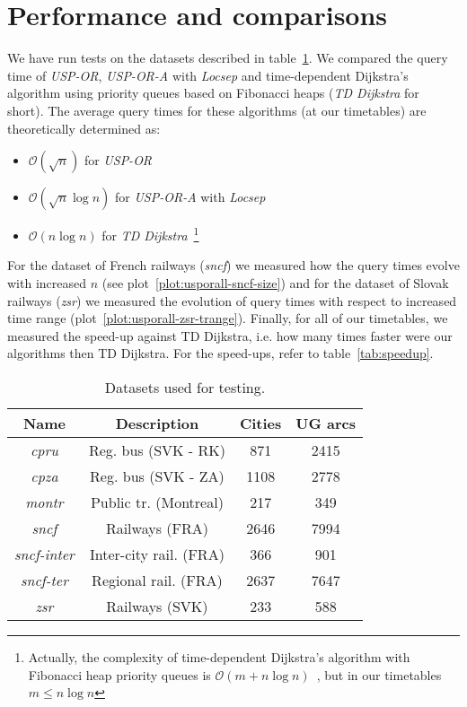 \documentclass{svk_long_en}
\begin{document}
\section{Performance and comparisons}

	We have run tests on the datasets described in table~\ref{table:tt_mainpr}. We compared the query time of \textit{USP-OR}, \textit{USP-OR-A} with \textit{Locsep} and time-dependent Dijkstra's algorithm using priority queues based on Fibonacci heaps (\textit{TD Dijkstra} for short). The average query times for these algorithms (at our timetables) are theoretically determined as:
	\begin{itemize}
		\item $\mathcal{O}(\sqrt{n})$ for \textit{USP-OR}
		\item $\mathcal{O}(\sqrt{n} \log n)$ for \textit{USP-OR-A} with \textit{Locsep}
		\item $\mathcal{O}(n \log n)$ for \textit{TD Dijkstra}~\footnote{Actually, the complexity of time-dependent Dijkstra's algorithm with Fibonacci heap priority queues is $\mathcal{O}(m + n \log n)$~\cite{sommerthesis10}, but in our timetables $m \leq n \log n$}
	\end{itemize}
	\hspace{\fill}
	
	For the dataset of French railways (\textit{sncf}) we measured how the query times evolve with increased $n$ (see plot~\ref{plot:usporall-sncf-size}) and for the dataset of Slovak railways (\textit{zsr}) we measured the evolution of query times with respect to increased time range (plot~\ref{plot:usporall-zsr-trange}). Finally, for all of our timetables, we measured the speed-up against TD Dijkstra, i.e. how many times faster were our algorithms then TD Dijkstra. For the speed-ups, refer to table~\ref{tab:speedup}. \\
	
	\begin{table}[h!]
		\centering
		\footnotesize
		\begin{tabular}{c|c|c|c}
			\rowcolor{tablehead}
			\textbf{Name} & \textbf{Description} & \textbf{Cities} & \textbf{UG arcs} \\
			\hline
			\textit{cpru} & Reg. bus (SVK - RK) & 871 & 2415 \\
			\textit{cpza} & Reg. bus (SVK - ZA) & 1108 & 2778 \\
			\textit{montr} & Public tr. (Montreal) & 217 & 349  \\
			\textit{sncf} & Railways (FRA) & 2646 & 7994 \\
			\textit{sncf-inter} & Inter-city rail. (FRA) & 366 & 901 \\
			\textit{sncf-ter} & Regional rail. (FRA) & 2637 & 7647 \\
			\textit{zsr} & Railways (SVK) & 233 & 588 \\
		\end{tabular}
		\caption{\label{table:tt_mainpr} Datasets used for testing.}
		\normalsize
	\end{table}	
\end{document}
